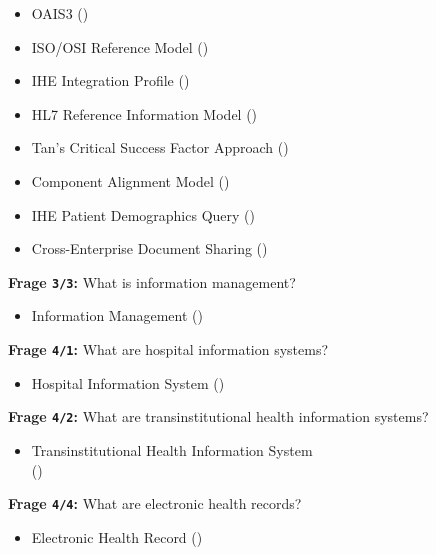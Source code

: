 \begin{itemize}
  \item OAIS3 ()
  \item ISO/OSI Reference Model ()
  \item IHE Integration Profile ()
  \item HL7 Reference Information Model ()
  \item Tan’s Critical Success Factor Approach ()
  \item Component Alignment Model ()
  \item IHE Patient Demographics Query ()
  \item Cross-Enterprise Document Sharing ()
\end{itemize}

\textbf{Frage \texttt{3/3}:} What is information management?

\begin{itemize}
  \item Information Management ()
\end{itemize}

\textbf{Frage \texttt{4/1}:} What are hospital information systems?

\begin{itemize}
  \item Hospital Information System ()
\end{itemize}

\textbf{Frage \texttt{4/2}:} What are transinstitutional health information systems?

\begin{itemize}
  \item Transinstitutional Health Information System \\
  () %
\end{itemize}

\textbf{Frage \texttt{4/4}:} What are electronic health records?

\begin{itemize}
  \item Electronic Health Record ()
\end{itemize}

